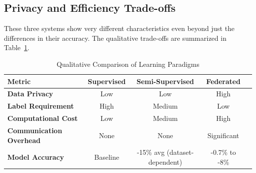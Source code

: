 \subsection{Privacy and Efficiency Trade-offs}
These three systems show very different characteristics even beyond just the differences in their accuracy. The qualitative trade-offs are summarized in Table~\ref{tab:paradigm_tradeoffs}.

\begin{table}[H]
    \centering
    \caption{Qualitative Comparison of Learning Paradigms}
    \label{tab:paradigm_tradeoffs}
    \renewcommand{\arraystretch}{1.3}
    \begin{tabular}{|l|c|c|c|c|}
        \hline
        \textbf{Metric} & \textbf{Supervised} & \textbf{Semi-Supervised} & \textbf{Federated} \\ \hline
        \textbf{Data Privacy} & Low & Low & High \\ \hline
        \textbf{Label Requirement} & High & Medium & Low \\ \hline
        \textbf{Computational Cost} & Low & Medium & High \\ \hline
        \textbf{Communication Overhead} & None & None & Significant \\ \hline
        \textbf{Model Accuracy} & Baseline & -15\% avg (dataset-dependent) & -0.7\% to -8\% \\ \hline
    \end{tabular}
\end{table}
